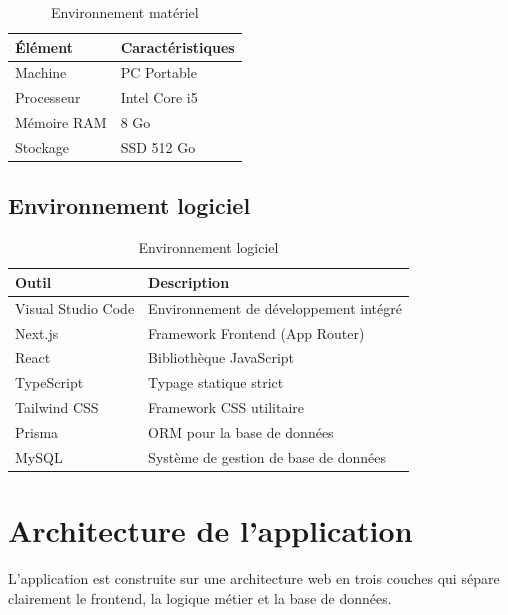 \begin{table}[H]
\centering
\caption{Environnement matériel}
\label{tab:ch2:materiel}
\begin{tabular}{|p{4cm}|p{10cm}|}
\hline
\textbf{Élément} & \textbf{Caractéristiques} \\
\hline
Machine      & PC Portable \\
\hline
Processeur   & Intel Core i5 \\
\hline
Mémoire RAM  & 8 Go \\
\hline
Stockage     & SSD 512 Go \\
\hline
\end{tabular}
\end{table}

\subsection{Environnement logiciel}

\begin{table}[H]
\centering
\caption{Environnement logiciel}
\label{tab:ch2:logiciel}
\begin{tabular}{|p{4cm}|p{10cm}|}
\hline
\textbf{Outil} & \textbf{Description} \\
\hline
Visual Studio Code & Environnement de développement intégré \\
\hline
Next.js            & Framework Frontend (App Router) \\
\hline
React              & Bibliothèque JavaScript \\
\hline
TypeScript         & Typage statique strict \\
\hline
Tailwind CSS       & Framework CSS utilitaire \\
\hline
Prisma             & ORM pour la base de données \\
\hline
MySQL              & Système de gestion de base de données \\
\hline
\end{tabular}
\end{table}

\section{Architecture de l'application}

L'application est construite sur une architecture web en trois couches qui sépare clairement le
frontend, la logique métier et la base de données.

